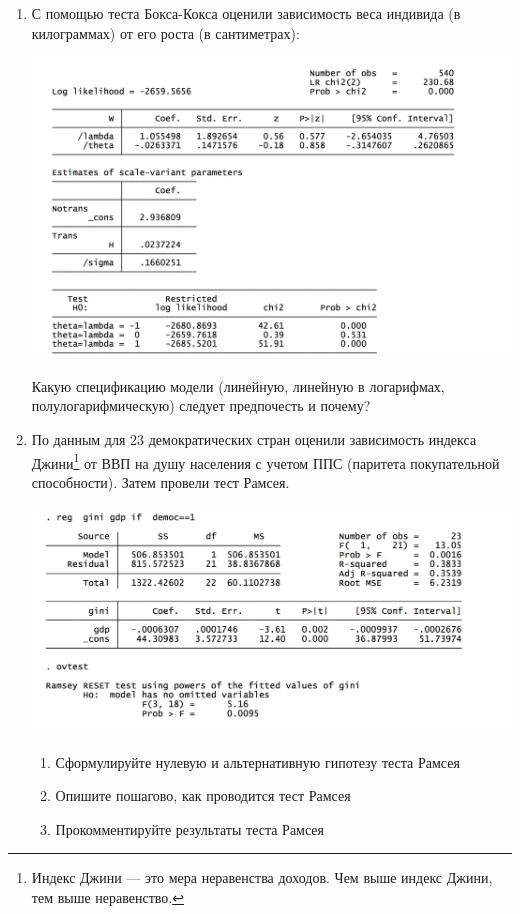 \documentclass[12pt, a4paper]{article}\usepackage[]{graphicx}\usepackage[]{color}
\begin{document}
\begin{enumerate}
\item С помощью теста Бокса-Кокса оценили зависимость веса индивида (в килограммах) от его роста (в сантиметрах):

\includegraphics[width=\textwidth]{figures/box_cox.png}

Какую спецификацию модели (линейную, линейную в логарифмах, полулогарифмическую) следует предпочесть и почему?


\item По данным для  23 демократических стран оценили зависимость индекса Джини\footnote{Индекс Джини — это мера неравенства доходов. Чем выше индекс Джини, тем выше неравенство.} от ВВП на душу населения с учетом ППС (паритета покупательной способности). Затем провели тест Рамсея.

\includegraphics[width=\textwidth]{figures/ramsey.png}

\begin{enumerate}
\item Сформулируйте нулевую и альтернативную гипотезу теста Рамсея
\item Опишите пошагово, как проводится тест Рамсея
\item Прокомментируйте результаты теста Рамсея
\end{enumerate}

\end{enumerate}
\end{document}

